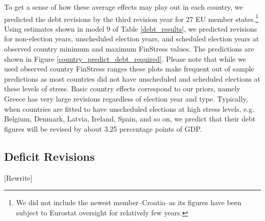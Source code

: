 \documentclass[]{article}
\begin{document}
To get a sense of how these average effects may play out in each country, we predicted the debt revisions by the third revision year for 27 EU member states.\footnote{We did not include the newest member--Croatia--as its figures have been subject to Eurostat oversight for relatively few years.} Using estimates shown in model 9 of Table \ref{debt_results}, we predicted revisions for non-election years, unscheduled election years, and scheduled election years at observed country minimum and maximum FinStress values. The predictions are shown in Figure \ref{country_predict_debt_required}. Please note that while we used observed country FinStress ranges these plots make frequent out of sample predictions as most countries did not have unscheduled and scheduled elections at these levels of stress. Basic country effects correspond to our priors, namely Greece has very large revisions regardless of election year and type. Typically, when countries are fitted to have unscheduled elections at high stress levels, e.g. Belgium, Denmark, Latvia, Ireland, Spain, and so on, we predict that their debt figures will be revised by about 3.25 percentage points of GDP.

\subsection{Deficit Revisions}

[Rewrite]

\end{document}
